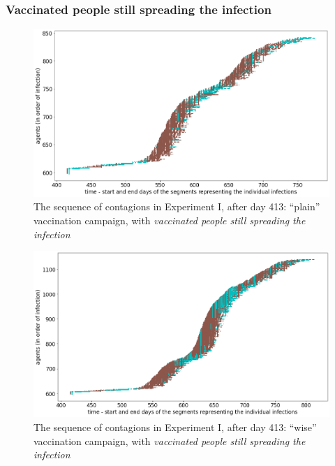 \documentclass[graybox]{svmult}
\begin{document}
\subsubsection{Vaccinated people still spreading the infection}

\begin{figure}[t]
\center
\includegraphics[scale=0.3]{ExperimentForGA_I_1>413.png}

\caption{The sequence of contagions in Experiment I, after day 413: ``plain'' vaccination campaign, with \emph{vaccinated people still spreading the infection}} 
\label{ExperimentForGA_I_1>413}
\end{figure}


\begin{figure}[t]
\center
\includegraphics[scale=0.3]{ExperimentForGA_I_2_1>413.png}

\caption{The sequence of contagions in Experiment I, after day 413: ``wise'' vaccination campaign, with \emph{vaccinated people still spreading the infection}} 
\label{ExperimentForGA_I_2_1>413}
\end{figure}
\end{document}
